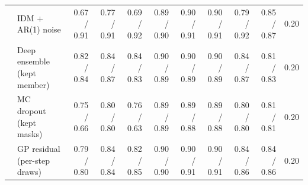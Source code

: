 \begin{longtable}{llrrrrrrrrr}
 & IDM + AR(1) noise & 0.67 / 0.91 & 0.77 / 0.91 & 0.69 / 0.92 & 0.89 / 0.90 & 0.90 / 0.91 & 0.90 / 0.91 & 0.79 / 0.92 & 0.85 / 0.87 & 0.20 \\
 & Deep ensemble (kept member) & 0.82 / 0.84 & 0.84 / 0.87 & 0.84 / 0.83 & 0.90 / 0.89 & 0.90 / 0.89 & 0.90 / 0.89 & 0.84 / 0.87 & 0.81 / 0.83 & 0.20 \\
 & MC dropout (kept masks) & 0.75 / 0.66 & 0.80 / 0.80 & 0.76 / 0.63 & 0.89 / 0.89 & 0.89 / 0.88 & 0.89 / 0.88 & 0.80 / 0.80 & 0.81 / 0.81 & 0.20 \\
 & GP residual (per-step draws) & 0.79 / 0.80 & 0.84 / 0.84 & 0.82 / 0.85 & 0.90 / 0.90 & 0.90 / 0.91 & 0.90 / 0.91 & 0.84 / 0.86 & 0.84 / 0.86 & 0.20 \\
\end{longtable}
\endgroup
